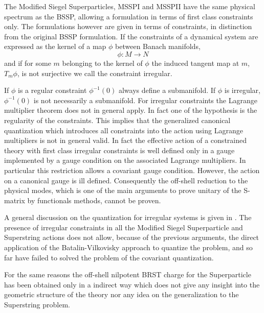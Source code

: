 \documentclass[a4paper,10pt]{article}
\begin{document}
The Modified Siegel Superparticles, MSSPI \cite{[6]} and MSSPII \cite{[7]} have
the same physical spectrum as the BSSP, allowing a formulation in
terms of first class constraints only. The formulations however
are given in terms of {} constraints, in
distinction from the original BSSP formulation. If the constraints
of a dynamical system are expressed as the kernel of a map  $\phi$
between Banach manifolds,
\begin{displaymath}
\phi :M\to N
\end{displaymath}
and if for some $m$ belonging to the kernel of $\phi$ the induced tangent map
at  $m$, $T_m\phi$, is not surjective we call the constraint irregular.

If $\phi$ is a regular constraint $\phi^{-1}(0)$ always define a
submanifold. If $\phi$ is irregular, $\phi^{-1}(0)$ is not necessarily a
submanifold. For irregular constraints the Lagrange multiplier theorem does
not in general apply. In fact one of the hypothesis is the regularity of the
constraints. This implies that the generalized canonical quantization which
introduces all constraints into the action using Lagrange multipliers is not
in general valid. In fact the effective action of a constrained theory with
first class irregular constraints is well defined only in a gauge implemented
by a gauge condition on the associated Lagrange multipliers. In particular
this restriction allows a covariant gauge condition. However, the action on a
canonical gauge is ill defined. Consequently the off-shell reduction to the
physical modes, which is one of the main arguments to prove unitary of the
S-matrix by  functionals methods, cannot be proven.

A general discussion on the quantization for irregular systems is given in \cite{[8]}.
The presence of irregular constraints in all the Modified Siegel Superparticle
and Superstring actions does not allow, because of the previous arguments, the
direct application of the Batalin-Vilkovisky approach to quantize the problem,
and so far have failed to solved the problem of the covariant quantization.

For the same reasons the off-shell nilpotent BRST charge for the
Superparticle \cite{[9]} has been obtained only in a indirect way which does not give
any insight into the geometric structure of the theory nor any idea on the
generalization to the Superstring problem.
\end{document}
